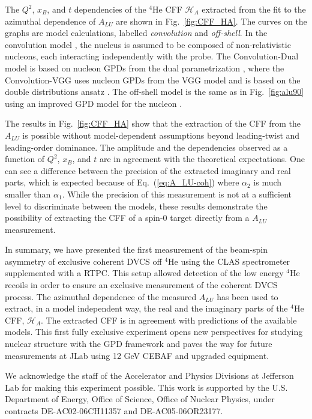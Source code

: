 \documentclass[twocolumn,nofootinbib,showpacs,prl,superscriptaddress,secnumarabic,amssymb,nobibnotes,aps,floatfix]{revtex4}
\begin{document}
The $Q^2$, $x_B$, and $t$ dependencies of the $^4$He CFF $\mathcal{H}_A$ 
extracted from the fit to the azimuthal dependence of $A_{LU}$ are shown in 
Fig.~\ref{fig:CFF_HA}. The curves on the graphs are model calculations, labelled 
{\it convolution} and {\it off-shell}. In the convolution model 
\cite{Vadim_priv}, the nucleus is assumed to be composed of non-relativistic 
nucleons, each interacting independently with the probe. The Convolution-Dual 
model is based on nucleon GPDs from the dual parametrization 
\cite{Guzey:2006xi}, where the Convolution-VGG uses nucleon GPDs  from the VGG 
model and is based on the double distributions ansatz \cite{DD_model}. The 
off-shell model is the same as in Fig.~\ref{fig:alu90} using an improved
GPD model for the nucleon \cite{GonzalezHernandez:2012jv}.

The results in Fig.~\ref{fig:CFF_HA} show that the extraction of the CFF
from the $A_{LU}$ is possible without model-dependent assumptions beyond
leading-twist and leading-order dominance. The amplitude and the dependencies 
observed as a function of 
$Q^{2}$, $x_B$, and $t$ are in agreement with the theoretical expectations. One 
can see a difference between the precision of the extracted imaginary and real 
parts, which is expected because of Eq.~(\ref{eq:A_LU-coh}) where 
$\alpha_2$ is much smaller than $\alpha_1$. While the precision of this 
measurement is not at a sufficient level to discriminate between the models, 
these results demonstrate the possibility of extracting the CFF of a spin-0 
target directly from a $A_{LU}$ measurement.


In summary, we have presented the first measurement of the beam-spin asymmetry
of exclusive coherent DVCS off $^4$He using the CLAS spectrometer supplemented 
with a RTPC. This setup allowed detection of the 
low energy $^4$He recoils in order to ensure an exclusive measurement of the
coherent DVCS process. The azimuthal dependence of the measured $A_{LU}$ has 
been used to extract, in a model independent way, the real and the imaginary 
parts of the $^4$He CFF, $\mathcal{H}_A$. The extracted CFF is in  
agreement with predictions of the available models. This first fully exclusive 
experiment opens new perspectives for studying nuclear structure with the GPD 
framework and paves the way for future measurements at JLab using 12 GeV CEBAF 
and upgraded equipment.


We acknowledge the staff of the Accelerator and Physics Divisions at Jefferson 
Lab for making this experiment possible. This work is supported by the U.S.  
Department of Energy, Office of Science, Office of Nuclear Physics, under 
contracts DE-AC02-06CH11357 and DE-AC05-06OR23177.
\end{document}
